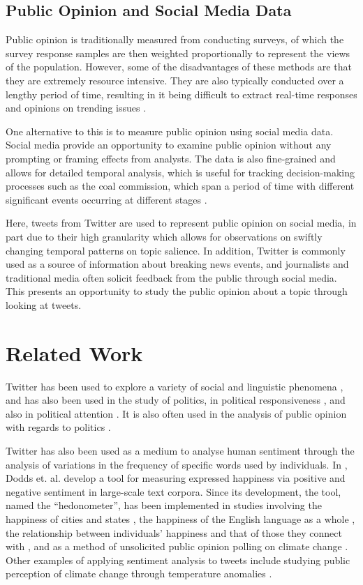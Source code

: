\documentclass[12pt,onecolumn,twoside]{layout}
\begin{document}
\subsection*{Public Opinion and Social Media Data} %
Public opinion is traditionally measured from conducting surveys, of which the survey response samples are then weighted proportionally to represent the views of the population. However, some of the disadvantages of these methods are that they are extremely resource intensive. They are also typically conducted over a lengthy period of time, resulting in it being difficult to extract real-time responses and opinions on trending issues \cite{Klasnja2018}. 

One alternative to this is to measure public opinion using social media data. Social media provide an opportunity to examine public opinion without any prompting or framing effects from analysts. The data is also fine-grained and allows for detailed temporal analysis, which is useful for tracking decision-making processes such as the coal commission, which span a period of time with different significant events occurring at different stages \cite{Klasnja2018}. 

Here, tweets from Twitter are used to represent public opinion on social media, in part due to their high granularity which allows for observations on swiftly changing temporal patterns on topic salience. In addition, Twitter is commonly used as a source of information about breaking news events, and journalists and traditional media often solicit feedback from the public through social media. This presents an opportunity to study the public opinion about a topic through looking at tweets. 

\section{Related Work} \label{sec:relatedwork}
Twitter has been used to explore a variety of social and linguistic phenomena \cite{Cao2012, Lin2013, Lin2014}, and has also been used in the study of politics, in political responsiveness \cite{Barbera2019}, and also in political attention \cite{Hemphill2014, Shapiro2017}. It is also often used in the analysis of public opinion with regards to politics \cite{DiGrazia2013, Vaccari2013, Barbera2019}.

Twitter has also been used as a medium to analyse human sentiment through the analysis of variations in the frequency of specific words used by individuals. In \cite{Dodds2011}, Dodds et. al. develop a tool for measuring expressed happiness via positive and negative sentiment in large-scale text corpora. Since its development, the tool, named the ``hedonometer'', has been implemented in studies involving the happiness of cities and states \cite{Bliss2012}, the happiness of the English language as a whole \cite{Kloumann2012}, the relationship between individuals' happiness and that of those they connect with \cite{Mitchell2013}, and as a method of unsolicited public opinion polling on climate change \cite{Cody2015}. Other examples of applying sentiment analysis to tweets include studying public perception of climate change through temperature anomalies \cite{Moore2019}. 
\end{document}
